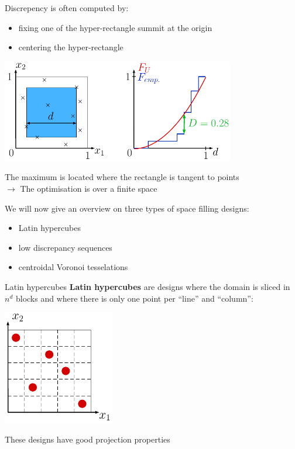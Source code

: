\begin{frame}{}
Discrepency is often computed by:
\begin{itemize}
 	\item fixing one of the hyper-rectangle summit at the origin
 	\item centering the hyper-rectangle
 \end{itemize}
\begin{center}
\includegraphics[height=4.5cm]{2_Design_of_experiments/figures/latexdraw/discrepency3}
\end{center}
The maximum is located where the rectangle is tangent to points\\
$\rightarrow$ The optimisation is over a finite space
\end{frame}

\begin{frame}{}
We will now give an overview on three types of space filling designs:
\begin{itemize}
	\item Latin hypercubes
	\item low discrepancy sequences
	\item centroidal Voronoi tesselations
\end{itemize}
\end{frame}

\begin{frame}{Latin hypercubes}
\textbf{Latin hypercubes} are designs where the domain is sliced in $n^d$ blocks and where there is only one point per ``line'' and ``column'':
\begin{center}
\includegraphics[height=5cm]{2_Design_of_experiments/figures/latexdraw/lhs1}
\end{center}
These designs have good projection properties
\end{frame}


